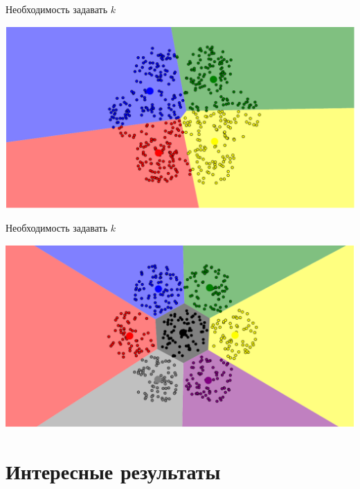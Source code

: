 \documentclass[10pt]{beamer}
\begin{document}
\begin{frame}{Необходимость задавать $k$}
	\begin{center}
	  \includegraphics[width= \textwidth, keepaspectratio = true]{images/k_means_k4}  
	\end{center}
\end{frame}

\begin{frame}{Необходимость задавать $k$}
	\begin{center}
	  \includegraphics[width= \textwidth, keepaspectratio = true]{images/k_means_k7}  
	\end{center}
\end{frame}

\section{Интересные результаты}
\end{document}

